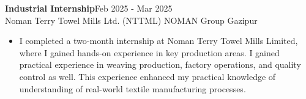 

 \textbf{Industrial Internship}\hfill Feb 2025 - Mar 2025\\
 \vspace{1mm}
 Noman Terry Towel Mills Ltd. (NTTML) \textbar{} NOMAN Group \hfill Gazipur\\
\begin{itemize}
\item  
\vspace{-2mm}
\begin{justify}I completed a two-month internship at Noman Terry Towel Mills Limited, where I gained hands-on experience in key production areas. I gained practical experience in weaving production, factory operations, and quality control as well. This experience enhanced my practical knowledge of understanding of real-world textile manufacturing processes.
\end{justify}
\end{itemize}